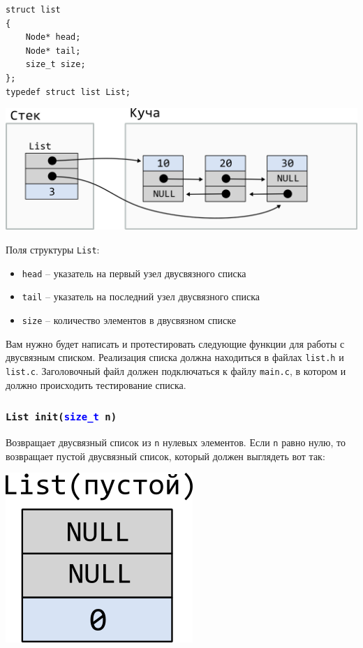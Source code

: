 \documentclass[10pt]{article}
\begin{document}
\noindent\begin{minipage}{.35\textwidth}
\begin{lstlisting}
struct list 
{
    Node* head;
    Node* tail;
    size_t size;
};
typedef struct list List;
\end{lstlisting}
\end{minipage}
\begin{minipage}{.55\textwidth}
\includegraphics[scale=0.8]{../images/list.png}
\end{minipage}

\noindent Поля структуры \texttt{List}:
\begin{itemize}
\item \texttt{head} -- указатель на первый узел двусвязного списка
\item \texttt{tail} -- указатель на последний узел двусвязного списка
\item \texttt{size} -- количество элементов в двусвязном списке
\end{itemize}
Вам нужно будет написать и протестировать следующие функции для работы с двусвязным списком.
Реализация списка должна находиться в файлах \texttt{list.h} и \texttt{list.c}. Заголовочный файл должен подключаться к файлу \texttt{main.c}, в котором и должно происходить тестирование списка.

\subsubsection{\texttt{List init(\textcolor{blue}{size\_t} n)}}
Возвращает двусвязный список из \texttt{n} нулевых элементов. Если \texttt{n} равно нулю, то возвращает пустой двусвязный список, который должен выглядеть вот так:
\begin{center}
\includegraphics[scale=1]{../images/list_empty.png}
\end{center}
\end{document}
